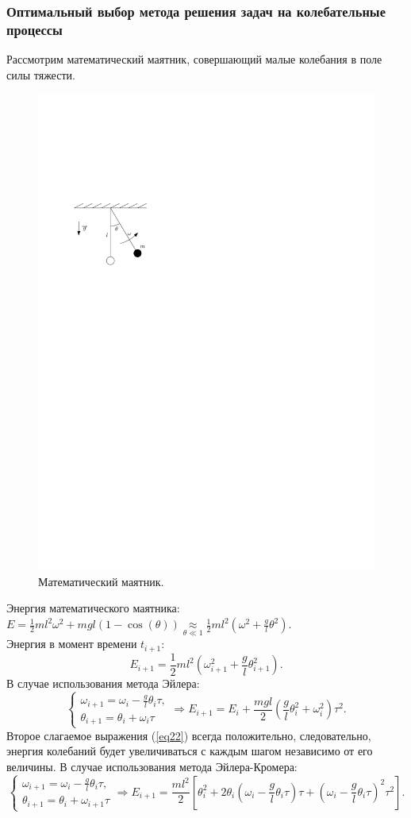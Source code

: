 \documentclass[
11pt,
master, %
subf, %
href, %
colorlinks=true, %
times, %
]{disser}
\begin{document}
\subsubsection{Оптимальный выбор метода решения задач на колебательные процессы}
Рассмотрим математический маятник, совершающий малые колебания в поле силы тяжести.
\begin{figure}[h]
  \centering
  \includegraphics[width=0.3\linewidth]{ris1.pdf}
  \caption{Математический маятник.}
  \label{ris:8}
\end{figure}
Энергия математического маятника: $E = \frac{1}{2} ml^2\omega^2 + mgl(1-\cos(\theta)) \underset{\theta\ll1}\approx \frac{1}{2}ml^2\left(\omega^2 + \frac{g}{l}\theta^2\right)$.\\
Энергия в момент времени $t_{i+1}$:
$$E_{i+1} = \frac{1}{2}ml^2\left(\omega_{i+1}^2 + \frac{g}{l}\theta_{i+1}^2\right).$$
В случае использования метода Эйлера:
\begin{equation}\label{eq22}
\left\{
    \begin{array}{ll}
    \omega_{i+1} = \omega_i - \frac{g}{l}\theta_i\tau,\\
    \theta_{i+1} = \theta_i + \omega_i \tau
  \end{array}
\right.\Rightarrow E_{i+1} = E_i + \frac{mgl}{2}\left(\frac{g}{l}\theta_i^2 + \omega_i^2\right)\tau^2.
\end{equation}
Второе слагаемое выражения (\ref{eq22}) всегда положительно, следовательно, энергия колебаний будет увеличиваться с каждым шагом независимо от его величины.
В случае использования метода Эйлера-Кромера:
$$\left\{
    \begin{array}{ll}
    \omega_{i+1} = \omega_i - \frac{g}{l}\theta_i\tau,\\
    \theta_{i+1} = \theta_i + \omega_{i+1} \tau
  \end{array}
\right.\Rightarrow E_{i+1} = \frac{ml^2}{2}\left[\theta_i^2 + 2\theta_i\left(\omega_i - \frac{g}{l}\theta_i\tau\right)\tau + \left(\omega_i - \frac{g}{l}\theta_i\tau\right)^2\tau^2\right].$$
\end{document}
